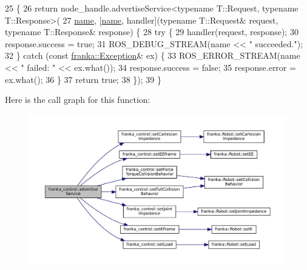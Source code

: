 \begin{DoxyCode}
25                                                                         \{
26   \textcolor{keywordflow}{return} node\_handle.advertiseService<\textcolor{keyword}{typename} T::Request, \textcolor{keyword}{typename} T::Response>(
27       \hyperlink{namespaceinteractive__marker_a447655961b3d3ca3c5a2a9d3d769436d}{name}, [\hyperlink{namespaceinteractive__marker_a447655961b3d3ca3c5a2a9d3d769436d}{name}, handler](\textcolor{keyword}{typename} T::Request& request, \textcolor{keyword}{typename} T::Response& response) \{
28         \textcolor{keywordflow}{try} \{
29           handler(request, response);
30           response.success = \textcolor{keyword}{true};
31           ROS\_DEBUG\_STREAM(name << \textcolor{stringliteral}{" succeeded."});
32         \} \textcolor{keywordflow}{catch} (\textcolor{keyword}{const} \hyperlink{structfranka_1_1Exception}{franka::Exception}& ex) \{
33           ROS\_ERROR\_STREAM(name << \textcolor{stringliteral}{" failed: "} << ex.what());
34           response.success = \textcolor{keyword}{false};
35           response.error = ex.what();
36         \}
37         \textcolor{keywordflow}{return} \textcolor{keyword}{true};
38       \});
39 \}
\end{DoxyCode}
Here is the call graph for this function\+:
\nopagebreak
\begin{figure}[H]
\begin{center}
\leavevmode
\includegraphics[width=350pt]{namespacefranka__control_ad9a13c60c284e90d4a1663071e5e1f33_cgraph}
\end{center}
\end{figure}
\mbox{\label{namespacefranka__control_a6c82cc16e5790da8663f879332670421}} 
